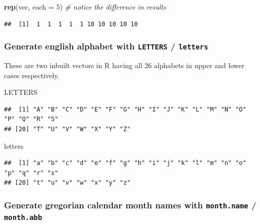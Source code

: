 \documentclass[
]{book}
\newenvironment{Shaded}{\begin{snugshade}}{\end{snugshade}}
\newcommand{\AttributeTok}[1]{\textcolor[rgb]{0.13,0.29,0.53}{#1}}
\newcommand{\CommentTok}[1]{\textcolor[rgb]{0.56,0.35,0.01}{\textit{#1}}}
\newcommand{\DecValTok}[1]{\textcolor[rgb]{0.00,0.00,0.81}{#1}}
\newcommand{\FunctionTok}[1]{\textcolor[rgb]{0.13,0.29,0.53}{\textbf{#1}}}
\newcommand{\NormalTok}[1]{#1}
\begin{document}
\begin{Shaded}
\begin{Highlighting}[]
\FunctionTok{rep}\NormalTok{(vec, }\AttributeTok{each =} \DecValTok{5}\NormalTok{) }\CommentTok{\# notice the difference in results}
\end{Highlighting}
\end{Shaded}

\begin{verbatim}
##  [1]  1  1  1  1  1 10 10 10 10 10
\end{verbatim}

\hypertarget{generate-english-alphabet-with-letters-letters}{%
\subsubsection*{\texorpdfstring{Generate english alphabet with \texttt{LETTERS} / \texttt{letters}}{Generate english alphabet with LETTERS / letters}}\label{generate-english-alphabet-with-letters-letters}}

These are two inbuilt vectors in R having all 26 alphabets in upper and lower cases respectively.

\begin{Shaded}
\begin{Highlighting}[]
\NormalTok{LETTERS}
\end{Highlighting}
\end{Shaded}

\begin{verbatim}
##  [1] "A" "B" "C" "D" "E" "F" "G" "H" "I" "J" "K" "L" "M" "N" "O" "P" "Q" "R" "S"
## [20] "T" "U" "V" "W" "X" "Y" "Z"
\end{verbatim}

\begin{Shaded}
\begin{Highlighting}[]
\NormalTok{letters}
\end{Highlighting}
\end{Shaded}

\begin{verbatim}
##  [1] "a" "b" "c" "d" "e" "f" "g" "h" "i" "j" "k" "l" "m" "n" "o" "p" "q" "r" "s"
## [20] "t" "u" "v" "w" "x" "y" "z"
\end{verbatim}

\hypertarget{generate-gregorian-calendar-month-names-with-month.name-month.abb}{%
\subsubsection*{\texorpdfstring{Generate gregorian calendar month names with \texttt{month.name} / \texttt{month.abb}}{Generate gregorian calendar month names with month.name / month.abb}}\label{generate-gregorian-calendar-month-names-with-month.name-month.abb}}
\end{document}
